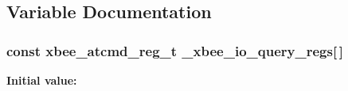 \subsection{Variable Documentation}
\hypertarget{group__xbee__io_ga7a1595c7d0d5f24cf4248e4f2d807639}{
\subsubsection[{\-\_\-xbee\-\_\-io\-\_\-query\-\_\-regs}]{\setlength{\rightskip}{0pt plus 5cm}const {\bf xbee\-\_\-atcmd\-\_\-reg\-\_\-t} \-\_\-xbee\-\_\-io\-\_\-query\-\_\-regs\mbox{[}$\,$\mbox{]}}}\label{group__xbee__io_ga7a1595c7d0d5f24cf4248e4f2d807639}
{\bfseries Initial value\-:}
